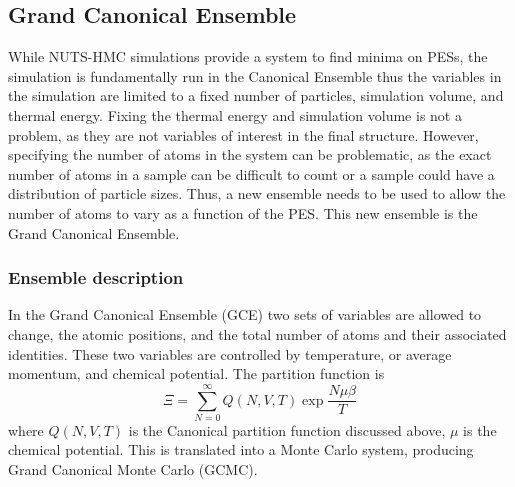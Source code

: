 \subsection{Grand Canonical Ensemble}
While NUTS-HMC simulations provide a system to find minima on PESs, the simulation is fundamentally run in the Canonical Ensemble thus the variables in the simulation are limited to a fixed number of particles, simulation volume, and thermal energy.
Fixing the thermal energy and simulation volume is not a problem, as they are not variables of interest in the final structure.
However, specifying the number of atoms in the system can be problematic, as the exact number of atoms in a sample can be difficult to count or a sample could have a distribution of particle sizes.
Thus, a new ensemble needs to be used to allow the number of atoms to vary as a function of the PES.
This new ensemble is the Grand Canonical Ensemble.

\subsubsection{Ensemble description}
In the Grand Canonical Ensemble (GCE) two sets of variables are allowed to change, the atomic positions, and the total number of atoms and their associated identities.
These two variables are controlled by temperature, or average momentum, and chemical potential.
The partition function is
\begin{equation}
  \Xi = \sum_{N=0}^{\infty} Q(N, V, T) \exp{\frac{N\mu\beta}{T}}
\end{equation}
where $Q(N, V, T)$ is the Canonical partition function discussed above, $\mu$ is the chemical potential. \cite{McQuarrie2000}
This is translated into a Monte Carlo system, producing Grand Canonical Monte Carlo (GCMC).

